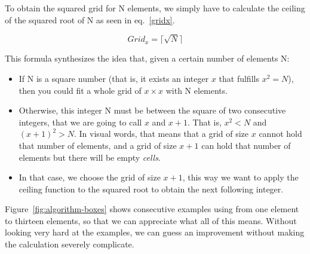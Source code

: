 To obtain the squared grid for N elements, we simply have to calculate the ceiling of the squared root of N as seen in eq.~\eqref{gridx}.

\begin{equation}
  Grid_{x} = \lceil\sqrt{N}\rceil \label{gridx}
\end{equation}

This formula synthesizes the idea that, given a certain number of elements N:

\begin{itemize}
  \item If N is a square number (that is, it exists an integer $x$ that fulfills $x^2 = N$), then you could fit a whole grid of $x\times{}x$ with N elements.
  \item Otherwise, this integer N must be between the square of two consecutive integers, that we are going to call $x$ and $x+1$.
  That is, $x^2 < N$ and $(x+1)^2 > N$.
  In visual words, that means that a grid of size $x$ cannot hold that number of elements, and a grid of size $x+1$ can hold that number of elements but there will be empty \emph{cells}.
  \item In that case, we choose the grid of size $x+1$, this way we want to apply the ceiling function to the squared root to obtain the next following integer.
\end{itemize}

Figure~\ref{fig:algorithm-boxes} shows consecutive examples using from one element to thirteen elements, so that we can appreciate what all of this means.
Without looking very hard at the examples, we can guess an improvement without making the calculation severely complicate.

